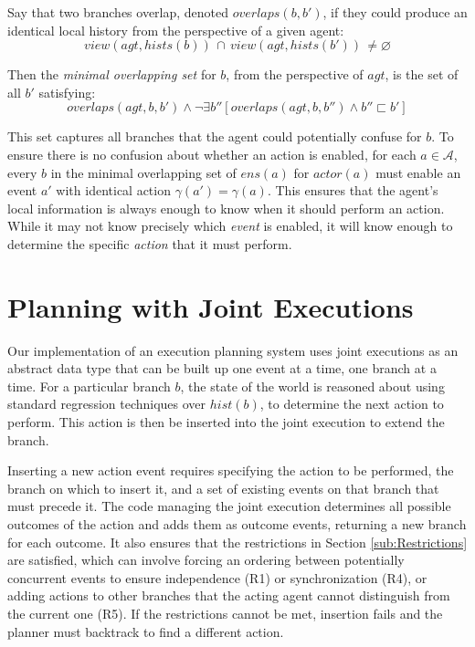 Say that two branches overlap, denoted $overlaps(b,b')$, if they
could produce an identical local history from the perspective of a
given agent:\[
view(agt,hists(b))\,\cap\, view(agt,hists(b'))\,\neq\varnothing\]


Then the \emph{minimal overlapping set} for $b$, from the perspective
of $agt$, is the set of all $b'$ satisfying:\[
overlaps(agt,b,b')\wedge\neg\exists b''\left[overlaps(agt,b,b'')\wedge b''\sqsubset b'\right]\]


This set captures all branches that the agent could potentially confuse
for $b$. To ensure there is no confusion about whether an action
is enabled, for each $a\in\mathcal{A}$, every $b$ in the minimal
overlapping set of $ens(a)$ for $actor(a)$ must enable an event
$a'$ with identical action $\gamma(a')=\gamma(a)$. This ensures
that the agent's local information is always enough to know when it
should perform an action. While it may not know precisely which \emph{event}
is enabled, it will know enough to determine the specific \emph{action}
that it must perform.


\section{Planning with Joint Executions\label{sec:JointExec:Planning}}

Our implementation of an execution planning system uses joint executions
as an abstract data type that can be built up one event at a time,
one branch at a time. For a particular branch $b$, the state of the
world is reasoned about using standard regression techniques over
$hist(b)$, to determine the next action to perform. This action is
then be inserted into the joint execution to extend the branch.

Inserting a new action event requires specifying the action to be
performed, the branch on which to insert it, and a set of existing
events on that branch that must precede it. The code managing the
joint execution determines all possible outcomes of the action and
adds them as outcome events, returning a new branch for each outcome.
It also ensures that the restrictions in Section \ref{sub:Restrictions}
are satisfied, which can involve forcing an ordering between potentially
concurrent events to ensure independence (R1) or synchronization (R4),
or adding actions to other branches that the acting agent cannot distinguish
from the current one (R5). If the restrictions cannot be met, insertion
fails and the planner must backtrack to find a different action.

